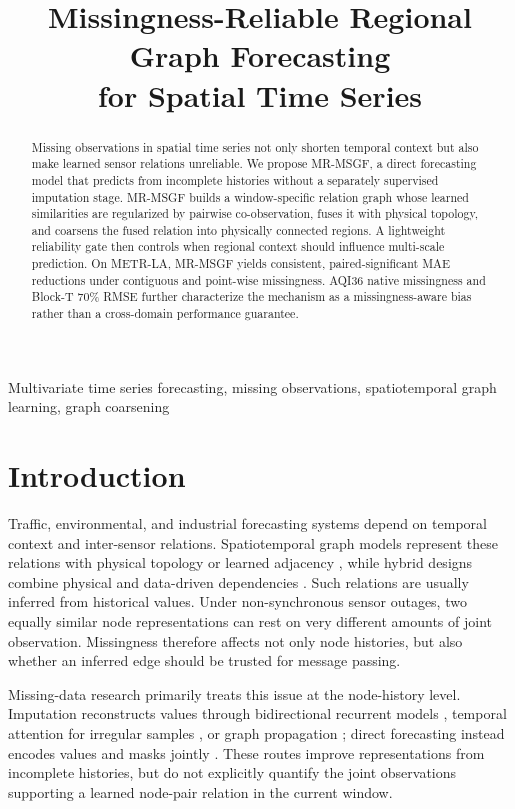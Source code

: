 \documentclass{article}
\title{Missingness-Reliable Regional Graph Forecasting\\
for Spatial Time Series}
\begin{document}
\maketitle
\raggedbottom

\begin{abstract}
Missing observations in spatial time series not only shorten temporal context but also make learned sensor relations unreliable. We propose MR-MSGF, a direct forecasting model that predicts from incomplete histories without a separately supervised imputation stage. MR-MSGF builds a window-specific relation graph whose learned similarities are regularized by pairwise co-observation, fuses it with physical topology, and coarsens the fused relation into physically connected regions. A lightweight reliability gate then controls when regional context should influence multi-scale prediction. On METR-LA, MR-MSGF yields consistent, paired-significant MAE reductions under contiguous and point-wise missingness. AQI36 native missingness and Block-T 70\% RMSE further characterize the mechanism as a missingness-aware bias rather than a cross-domain performance guarantee.
\end{abstract}

\begin{keywords}
Multivariate time series forecasting, missing observations, spatiotemporal graph learning, graph coarsening
\end{keywords}

\section{Introduction}

Traffic, environmental, and industrial forecasting systems depend on temporal context and inter-sensor relations. Spatiotemporal graph models represent these relations with physical topology or learned adjacency \cite{dcrnn,mtgnn}, while hybrid designs combine physical and data-driven dependencies \cite{stfgnn}. Such relations are usually inferred from historical values. Under non-synchronous sensor outages, two equally similar node representations can rest on very different amounts of joint observation. Missingness therefore affects not only node histories, but also whether an inferred edge should be trusted for message passing.

Missing-data research primarily treats this issue at the node-history level. Imputation reconstructs values through bidirectional recurrent models \cite{brits}, temporal attention for irregular samples \cite{mtan}, or graph propagation \cite{grin,spin}; direct forecasting instead encodes values and masks jointly \cite{crib,coifnet}. These routes improve representations from incomplete histories, but do not explicitly quantify the joint observations supporting a learned node-pair relation in the current window.
\end{document}
